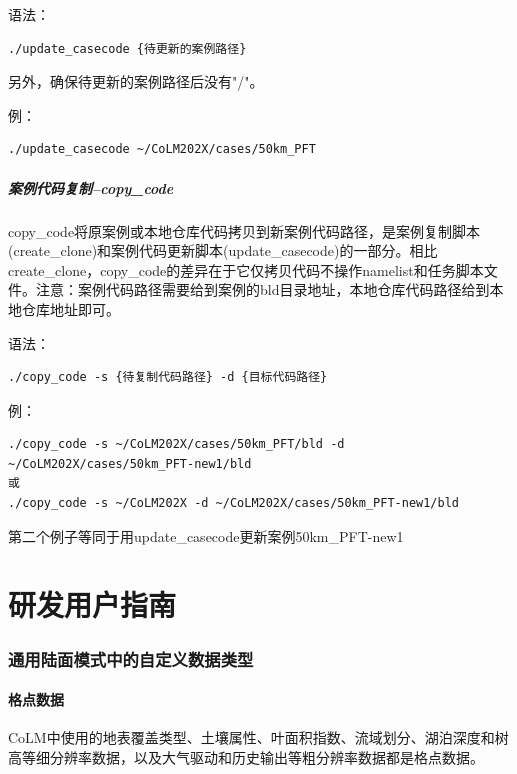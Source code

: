 \documentclass[a4paper,12pt,twoside]{article}
\begin{document}
语法：
\begin{lstlisting}
./update_casecode {待更新的案例路径}
\end{lstlisting}
另外，确保待更新的案例路径后没有"/"。

例：
\begin{lstlisting}
./update_casecode ~/CoLM202X/cases/50km_PFT
\end{lstlisting}


\subsubsection{案例代码复制--copy\_code}
copy\_code将原案例或本地仓库代码拷贝到新案例代码路径，是案例复制脚本(create\_clone)和案例代码更新脚本(update\_casecode)的一部分。相比create\_clone，copy\_code的差异在于它仅拷贝代码不操作namelist和任务脚本文件。注意：案例代码路径需要给到案例的bld目录地址，本地仓库代码路径给到本地仓库地址即可。

语法：
\begin{lstlisting}
./copy_code -s {待复制代码路径} -d {目标代码路径} 
\end{lstlisting}

例：
\begin{lstlisting}
./copy_code -s ~/CoLM202X/cases/50km_PFT/bld -d ~/CoLM202X/cases/50km_PFT-new1/bld
或
./copy_code -s ~/CoLM202X -d ~/CoLM202X/cases/50km_PFT-new1/bld
\end{lstlisting}
第二个例子等同于用update\_casecode更新案例50km\_PFT-new1

\clearpage

\part{研发用户指南}

\section{通用陆面模式中的自定义数据类型}

\subsection{格点数据}
CoLM中使用的地表覆盖类型、土壤属性、叶面积指数、流域划分、湖泊深度和树高等细分辨率数据，以及大气驱动和历史输出等粗分辨率数据都是格点数据。
\end{document}
